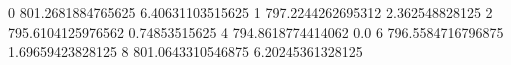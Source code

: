 0 801.2681884765625 6.40631103515625
1 797.2244262695312 2.362548828125
2 795.6104125976562 0.74853515625
4 794.8618774414062 0.0
6 796.5584716796875 1.69659423828125
8 801.0643310546875 6.20245361328125

